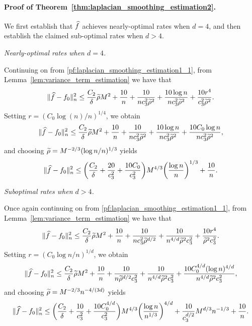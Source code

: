 \paragraph{Proof of Theorem~\ref{thm:laplacian_smoothing_estimation2}.}
We first establish that $\widehat{f}$ achieves nearly-optimal rates when $d = 4$, and then establish the claimed sub-optimal rates when $d > 4$.

\textit{Nearly-optimal rates when $d = 4$.}

Continuing on from \eqref{pf:laplacian_smoothing_estimation1_1}, from Lemma~\ref{lem:variance_term_estimation} we have that
\begin{equation*}
\|\widehat{f} - f_0\|_n^2 \leq \frac{C_2}{\delta} \widetilde{\rho} M^2 + \frac{10}{n} +  \frac{10}{nc_3^2\widetilde{\rho}^2} +  \frac{10 \log n}{nc_3^2\widetilde{\rho}^2} + \frac{10r^4}{c_3^2\widetilde{\rho}^2}.
\end{equation*}
Setting $r = (C_0\log(n)/n)^{1/4}$, we obtain
\begin{equation*}
\|\widehat{f} - f_0\|_n^2 \leq \frac{C_2}{\delta} \widetilde{\rho} M^2 + \frac{10}{n} +  \frac{10}{nc_3^2\widetilde{\rho}^2} +  \frac{10 \log n}{nc_3^2\widetilde{\rho}^2} + \frac{10C_0\log n}{nc_3^2\widetilde{\rho}^2},
\end{equation*}
and choosing $\widetilde{\rho} = M^{-2/3}(\log n/n)^{1/3}$ yields
\begin{equation*}
\|\widehat{f} - f_0\|_n^2 \leq \biggl(\frac{C_2}{\delta} + \frac{20}{c_3^2} + \frac{10C_0}{c_3^2}\biggr) M^{4/3} \biggl(\frac{\log n}{n}\biggr)^{1/3} + \frac{10}{n}.
\end{equation*}

\textit{Suboptimal rates when $d > 4$.}

Once again continuing on from \eqref{pf:laplacian_smoothing_estimation1_1}, from Lemma~\ref{lem:variance_term_estimation} we have that
\begin{equation*}
\|\widehat{f} - f_0\|_n^2 \leq \frac{C_2}{\delta} \widetilde{\rho} M^2 + \frac{10}{n} + \frac{10}{nc_3^{2}\widetilde{\rho}^{d/2}} +  \frac{10}{n^{4/d}\widetilde{\rho}^2c_3^2} + \frac{10r^4}{\widetilde{\rho}^2c_3^2}.
\end{equation*}
Setting $r = (C_0\log n/n)^{1/d}$, we obtain
\begin{equation*}
\|\widehat{f} - f_0\|_n^2 \leq \frac{C_2}{\delta} \widetilde{\rho} M^2 + \frac{10}{n} + \frac{10}{n\widetilde{\rho}^{d/2}c_3^{2}} +  \frac{10}{n^{4/d}\widetilde{\rho}^2c_3^2} + \frac{10C_0^{4/d}(\log n)^{4/d}}{n^{4/d}\widetilde{\rho}^2c_3^2},
\end{equation*}
and choosing $\widetilde{\rho} = M^{-2/3}n^{-4/(3d)}$ yields
\begin{equation*}
\|\widehat{f} - f_0\|_n^2 \leq \biggl(\frac{C_2}{\delta} + \frac{10}{c_3^2} + \frac{10C_0^{4/d}}{c_3^2}\biggr)M^{4/3}\biggl(\frac{\log n}{n^{1/3}}\biggr)^{4/d} + \frac{10}{c_3^{d/2}}M^{d/3}n^{-1/3} + \frac{10}{n}.
\end{equation*}

